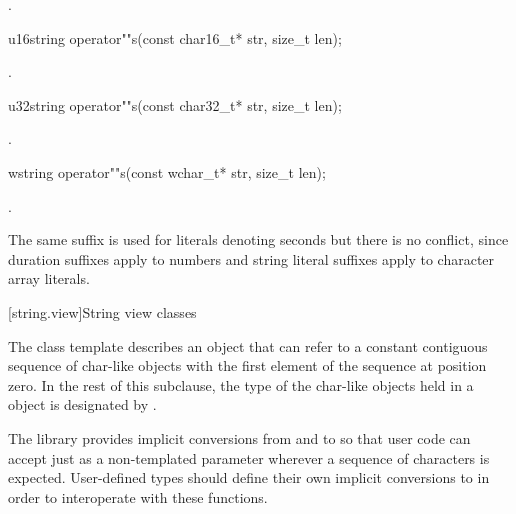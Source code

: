 \begin{itemdescr}
\pnum
\returns
{}.
\end{itemdescr}

%
\begin{itemdecl}
u16string operator""s(const char16_t* str, size_t len);
\end{itemdecl}
\begin{itemdescr}
\pnum
\returns
{}.
\end{itemdescr}

%
\begin{itemdecl}
u32string operator""s(const char32_t* str, size_t len);
\end{itemdecl}
\begin{itemdescr}
\pnum
\returns
{}.
\end{itemdescr}

%
\begin{itemdecl}
wstring operator""s(const wchar_t* str, size_t len);
\end{itemdecl}
\begin{itemdescr}
\pnum
\returns
{}.
\end{itemdescr}

\pnum \begin{note}
The same suffix  is used for  literals denoting seconds but there is no conflict, since duration suffixes apply to numbers and string literal suffixes apply to character array literals.
\end{note}

[string.view]{String view classes}

\pnum
The class template  describes an object that can refer to a constant contiguous sequence of char-like objects with the first element of the sequence at position zero.
In the rest of this subclause, the type of the char-like objects held in a  object is designated by .

\pnum
\begin{note}
The library provides implicit conversions from  and  to  so that user code can accept just  as a non-templated parameter wherever a sequence of characters is expected.
User-defined types should define their own implicit conversions to  in order to interoperate with these functions.
\end{note}

